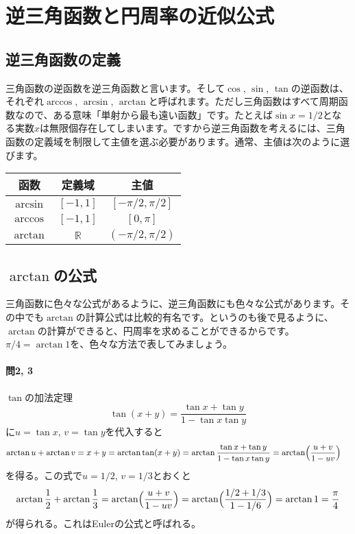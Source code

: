 \section{逆三角函数と円周率の近似公式}

\subsection{逆三角函数の定義}

三角函数の逆函数を逆三角函数と言います。そして$\cos$, $\sin$, $\tan$の逆函数は、それぞれ$\arccos$, $\arcsin$, $\arctan$と呼ばれます。ただし三角函数はすべて周期函数なので、ある意味「単射から最も遠い函数」です。たとえば$\sin x = 1/2$となる実数$x$は無限個存在してしまいます。ですから逆三角函数を考えるには、三角函数の定義域を制限して主値を選ぶ必要があります。通常、主値は次のように選びます。
\begin{table}[h!tbp]
\begin{center}
\begin{tabular}{ccc} \hline
函数 & 定義域 & 主値 \\ \hline
$\arcsin$ & $[-1,1]$ & $[-\pi/2,\pi/2]$ \\
$\arccos$ & $[-1,1]$ & $[0,\pi]$ \\
$\arctan$ & $\mathbb{R}$ & $(-\pi/2,\pi/2)$ \\ \hline
\end{tabular}
\end{center}
\end{table}

\subsection{$\arctan$の公式}

三角函数に色々な公式があるように、逆三角函数にも色々な公式があります。その中でも$\arctan$の計算公式は比較的有名です。というのも後で見るように、$\arctan$の計算ができると、円周率を求めることができるからです。$\pi/4 = \arctan 1$を、色々な方法で表してみましょう。

\paragraph{問2, 3} $\tan$の加法定理
\[
\tan(x+y) = \frac{\tan x + \tan y}{1 - \tan x\tan y}
\]
に$u=\tan x$, $v=\tan y$を代入すると
\begin{align*}
\arctan u + \arctan v
&= x + y = \arctan \tan(x+y)
= \arctan \frac{\tan x + \tan y}{1 - \tan x\tan y}
= \arctan \Bigl(\frac{u+v}{1-uv}\Bigr)
\end{align*}
を得る。この式で$u=1/2$, $v=1/3$とおくと
\[
\arctan \frac{1}{2} + \arctan \frac{1}{3} = \arctan \Bigl(\frac{u+v}{1-uv}\Bigr) = \arctan \Bigl(\frac{1/2+1/3}{1-1/6}\Bigr) = \arctan 1 = \frac{\pi}{4}
\]
が得られる。これはEulerの公式と呼ばれる。

